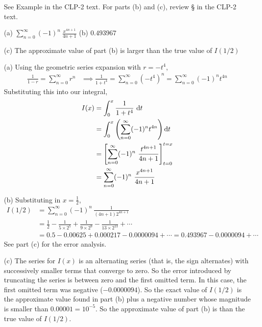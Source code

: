 \begin{hint}
See Example  in the
CLP-2 text.
For parts (b) and (c), review  \S {} in the
CLP-2 text.

\end{hint}

\begin{answer}
(a) $\displaystyle\sum\limits_{n=0}^\infty (-1)^n\ \frac{x^{4n+1}}{4n+1}$
\qquad (b)
$0.493967$

\noindent (c) The approximate value of part (b) is larger than the true value
of $I(1/2)$
\end{answer}

\begin{solution} (a) Using the geometric series expansion with $r=-t^4$,
\begin{align*}
\frac{1}{1-r} =\sum_{n=0}^\infty r^n
&\implies\frac{1}{1+t^4} =\sum_{n=0}^\infty {(-t^4)}^n =\sum_{n=0}^\infty (-1)^nt^{4n}
\end{align*}
Substituting this into our integral,
\begin{align*}
I(x)
&=\int_0^x\frac{1}{1+t^4}\ \dee{t} \\
&=\int_0^x \left( \sum_{n=0}^\infty (-1)^n t^{4n}\right)\dee{t}\\
&=\left[\sum\limits_{n=0}^\infty (-1)^n\ \frac{t^{4n+1}}{4n+1}\right]_{t=0}^{t=x}\\
&=\sum\limits_{n=0}^\infty (-1)^n\ \frac{x^{4n+1}}{4n+1}
\end{align*}

\noindent (b)  Substituting in $x=\frac{1}{2}$,
\begin{align*}
I(1/2)&=\sum_{n=0}^\infty (-1)^n\ \frac{1}{(4n+1)2^{4n+1}}\\
&=\frac12-\frac{1}{5\times2^5}+\frac{1}{9\times 2^9}
-\frac{1}{13\times 2^{13}}+\cdots\\
&=0.5-0.00625+0.000217-0.0000094+\cdots
=\boxed{0.493967}-0.0000094+\cdots
\end{align*}
See part (c) for the error analysis.

\noindent (c)
The series for $I(x)$ is an alternating series (that is, the sign alternates)
with successively smaller terms that converge to zero. So the error introduced by
truncating the series is between zero and the first omitted term. In this case, the
first omitted term was negative ($-0.0000094$). So the exact value of $I(1/2)$
is the approximate value found in part (b) plus a negative number whose
magnitude is smaller than $0.00001=10^{-5}$.
So the approximate value of part (b) is  than the true value
of $I(1/2)$.

\end{solution}

